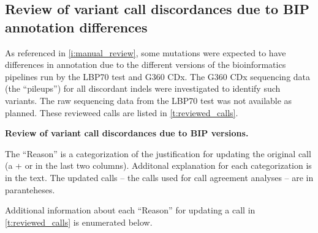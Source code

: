\documentclass[12pt]{protocol}
\begin{document}
\begin{appendices}
\newpage
\section{Review of variant call discordances due to BIP annotation differences}
\label{a:reviewed_calls}

As referenced in \cref{i:manual_review}, some mutations were expected
to have differences in annotation due to the different versions of the
bioinformatics pipelines run by the LBP70 test and G360 CDx.
The G360 CDx sequencing data (the ``pileups'') for all discordant indels
were investigated to identify such variants. The raw sequencing data
from the LBP70 test was not available as planned.
These revieweed calls
are listed in \cref{t:reviewed_calls}.

\captionsetup{justification=justified,singlelinecheck=off,skip=0pt}
\begin{table}[H]
\centering
\begin{threeparttable}
\caption[Review of variant call discordances due to BIP versions]
{\textbf{Review of variant call discordances due to BIP versions.}}
\label{t:reviewed_calls}

\caption*{The ``Reason'' is a categorization of the justification for updating the 
original call (a + or \textminus in the last two columns). Additonal
explanation for each categorization is in the text. The updated
calls -- the calls used for call agreement analyses -- are in paranteheses.}
\end{threeparttable}
\end{table}

Additional information about each ``Reason'' for updating a call in 
\cref{t:reviewed_calls} is enumerated below.


\end{appendices}
\end{document}
